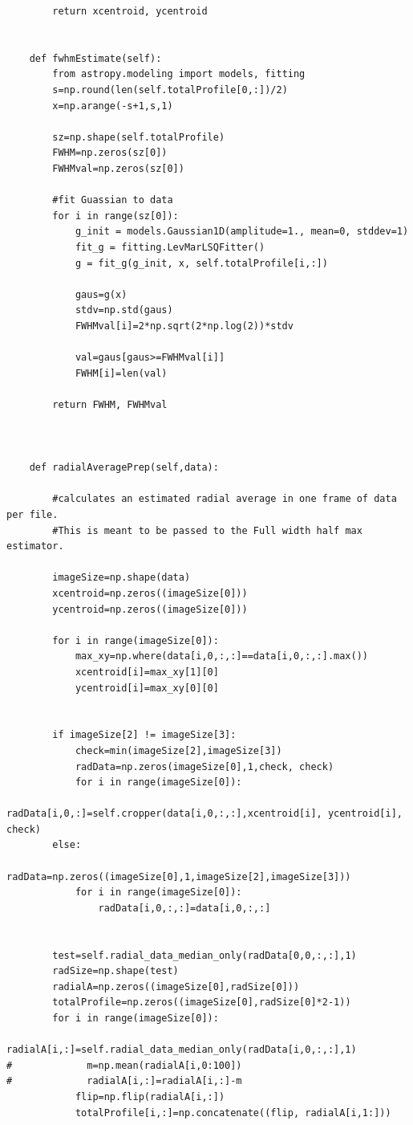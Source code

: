 \begin{lstlisting}
        return xcentroid, ycentroid


    def fwhmEstimate(self):
        from astropy.modeling import models, fitting 
        s=np.round(len(self.totalProfile[0,:])/2)
        x=np.arange(-s+1,s,1)
        
        sz=np.shape(self.totalProfile)
        FWHM=np.zeros(sz[0])
        FWHMval=np.zeros(sz[0])
        
        #fit Guassian to data
        for i in range(sz[0]):
            g_init = models.Gaussian1D(amplitude=1., mean=0, stddev=1)
            fit_g = fitting.LevMarLSQFitter()
            g = fit_g(g_init, x, self.totalProfile[i,:])
            
            gaus=g(x)
            stdv=np.std(gaus)
            FWHMval[i]=2*np.sqrt(2*np.log(2))*stdv
            
            val=gaus[gaus>=FWHMval[i]]
            FWHM[i]=len(val)
            
        return FWHM, FWHMval
            
            
    
    def radialAveragePrep(self,data):
        
        #calculates an estimated radial average in one frame of data per file. 
        #This is meant to be passed to the Full width half max estimator.
        
        imageSize=np.shape(data)
        xcentroid=np.zeros((imageSize[0]))
        ycentroid=np.zeros((imageSize[0]))
        
        for i in range(imageSize[0]):
            max_xy=np.where(data[i,0,:,:]==data[i,0,:,:].max())
            xcentroid[i]=max_xy[1][0]
            ycentroid[i]=max_xy[0][0]
        
        
        if imageSize[2] != imageSize[3]:
            check=min(imageSize[2],imageSize[3])
            radData=np.zeros(imageSize[0],1,check, check)
            for i in range(imageSize[0]):
                radData[i,0,:]=self.cropper(data[i,0,:,:],xcentroid[i], ycentroid[i], check)
        else:
            radData=np.zeros((imageSize[0],1,imageSize[2],imageSize[3]))
            for i in range(imageSize[0]):
                radData[i,0,:,:]=data[i,0,:,:]
                
        
        test=self.radial_data_median_only(radData[0,0,:,:],1)
        radSize=np.shape(test)
        radialA=np.zeros((imageSize[0],radSize[0]))
        totalProfile=np.zeros((imageSize[0],radSize[0]*2-1))
        for i in range(imageSize[0]):
            radialA[i,:]=self.radial_data_median_only(radData[i,0,:,:],1)
#             m=np.mean(radialA[i,0:100])
#             radialA[i,:]=radialA[i,:]-m
            flip=np.flip(radialA[i,:])
            totalProfile[i,:]=np.concatenate((flip, radialA[i,1:]))
        

\end{lstlisting}
